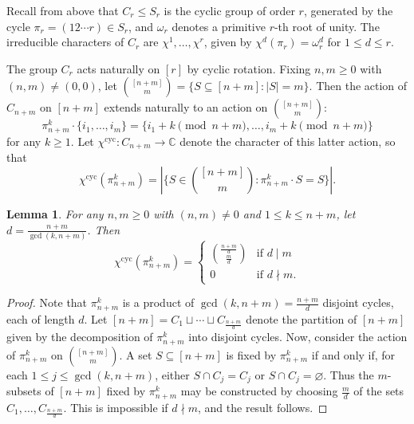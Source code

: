 \documentclass[11pt]{article}
\newtheorem{lemma}[theo]{Lemma}
\theoremstyle{definition}
\numberwithin{equation}{section}
\newcommand\CC{\mathbb{C}}
\begin{document}
Recall from above that $C_r \le S_r$ is the cyclic group of order $r$, generated by the cycle $\pi_r = (1 2 \cdots r) \in S_r$, and $\omega_r$ denotes a primitive $r$-th root of unity. The irreducible characters of $C_r$ are $\chi^1, \ldots, \chi^r$, given by $\chi^d(\pi_r) = \omega_r^d$ for $1 \le d \le r$.

The group $C_r$ acts naturally on $[r]$ by cyclic rotation. Fixing $n,m \ge 0$ with $(n,m) \neq (0,0)$, let $\binom{[n+m]}{m} = \{ S \subseteq [n+m] : |S| = m \}$. Then the action of $C_{n+m}$ on $[n+m]$ extends naturally to an action on $\binom{[n+m]}{m}$:
\[
\pi_{n+m}^k \cdot \{ i_1, \ldots, i_m \} = \{ i_1 + k\pmod{n+m}, \ldots, i_m + k\pmod{n+m} \}
\]
for any $k \ge 1$. Let $\chi^\mathrm{cyc} : C_{n+m} \to \CC$ denote the character of this latter action, so that
\[
\chi^\mathrm{cyc}(\pi_{n+m}^k) = |\{ S \in \binom{[n+m]}{m} : \pi_{n+m}^k \cdot S = S \}|.
\]

\begin{lemma}\label{cyc-char}
For any $n,m \ge 0$ with $(n,m) \neq 0$ and $1 \le k \le n+m$, let $d = \frac{n+m}{\gcd(k,n+m)}$. Then
\[
\chi^\mathrm{cyc}(\pi_{n+m}^k) = \begin{cases}
\binom{\frac{n+m}{d}}{\frac{m}{d}} & \text{if } d \mid m \\
0 & \text{if } d \nmid m.
\end{cases}
\]
\end{lemma}
\begin{proof}
Note that $\pi_{n+m}^k$ is a product of $\gcd(k,n+m) = \frac{n+m}{d}$ disjoint cycles, each of length $d$. Let $[n+m] = C_1 \sqcup \cdots \sqcup C_{\frac{n+m}{d}}$ denote the partition of $[n+m]$ given by the decomposition of $\pi_{n+m}^k$ into disjoint cycles. Now, consider the action of $\pi_{n+m}^k$ on $\binom{[n+m]}{m}$. A set $S \subseteq [n+m]$ is fixed by $\pi_{n+m}^k$ if and only if, for each $1 \le j \le \gcd(k,n+m)$, either $S \cap C_j = C_j$ or $S \cap C_j = \varnothing$. Thus the $m$-subsets of $[n+m]$ fixed by $\pi_{n+m}^k$ may be constructed by choosing $\frac{m}{d}$ of the sets $C_1,\ldots,C_{\frac{n+m}{d}}$. This is impossible if $d \nmid m$, and the result follows.
\end{proof}
\end{document}
